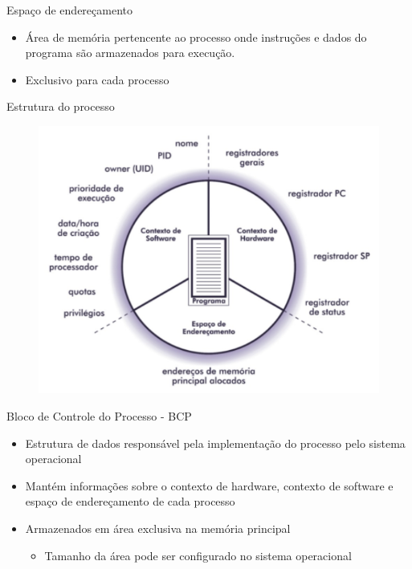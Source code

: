 \documentclass[aspectratio=169,
				xcolor=table]{beamer}
\begin{document}
	\begin{frame}{Espaço de endereçamento}
		\begin{itemize}
			\item Área de memória pertencente ao processo onde instruções e dados do programa são armazenados para execução.
			\vspace{1em}
			\item Exclusivo para cada processo
		\end{itemize}
	\end{frame}
	
	\begin{frame}{Estrutura do processo}	
		\begin{figure}[hbtp]
			\centering
			\includegraphics[keepaspectratio, height=.8\textheight]{../figs/cap03/estrutura1.png}
		\end{figure}
	\end{frame}	
	
	\begin{frame}{Bloco de Controle do Processo - BCP}
		\begin{itemize}
			\item Estrutura de dados responsável pela implementação do processo pelo sistema operacional
			\vspace{1em}
			\item Mantém informações sobre o contexto de hardware, contexto de software e espaço de endereçamento de cada processo
			\vspace{1em}
			\item Armazenados em área exclusiva na memória principal
			\begin{itemize}
				\item Tamanho da área pode ser configurado no sistema operacional
			\end{itemize}
		\end{itemize}
	\end{frame}
	
\end{document}
